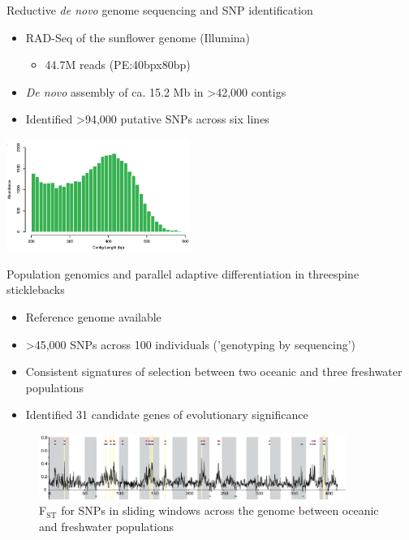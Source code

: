 \documentclass[presentation]{beamer}
\begin{document}
\begin{frame}[label=sec-1-0-3]{Reductive \emph{de novo} genome sequencing and SNP identification}
\begin{itemize}
\item RAD-Seq of the sunflower genome (Illumina)
\begin{itemize}
\item 44.7M reads (PE:40bpx80bp)
\end{itemize}
\item \emph{De novo} assembly of ca. 15.2 Mb 
in >42,000 contigs
\item Identified >94,000 putative SNPs across six lines
\end{itemize}
\begin{center}

\includegraphics[width=6cm]{Pegadarju2013Fig3a.png}


\tiny{\citep{Pegadaraju2013}}
\end{center}
\end{frame}





\begin{frame}[label=sec-1-0-4]{Population genomics and parallel adaptive differentiation in threespine sticklebacks}
\begin{itemize}
\item Reference genome available
\item >45,000 SNPs across 100 individuals ('genotyping by sequencing')
\item Consistent signatures of selection between two oceanic and three
freshwater populations
\item Identified 31 candidate genes of evolutionary significance
\end{itemize}


\begin{figure}[htb]
\centering
\includegraphics[width=10cm]{Hohenlohe2010Fig6e.png}
\caption{F\(_{\text{ST}}\) for SNPs in sliding windows across the genome between oceanic and freshwater populations}
\end{figure}


\begin{center}
\tiny{\citep{Hohenlohe2010}}
\end{center}
\end{frame}
\end{document}
